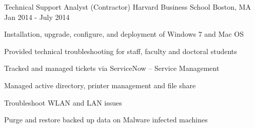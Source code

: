 \begin{cventries}
  \cventry
    {Technical Support Analyst (Contractor)} %
    {Harvard Business School} %
    {Boston, MA} %
    {Jan 2014 - July 2014} %
    {
      \begin{cvitems} %
        \item {Installation, upgrade, configure, and deployment of Windows 7 and Mac OS}
		    \item {Provided technical troubleshooting for staff, faculty and doctoral students}
		    \item {Tracked and managed tickets via ServiceNow – Service Management}
		    \item {Managed active directory, printer management and file share}
		    \item {Troubleshoot WLAN and LAN issues}
		    \item {Purge and restore backed up data on Malware infected machines}
      \end{cvitems}
    }
   
\end{cventries}
